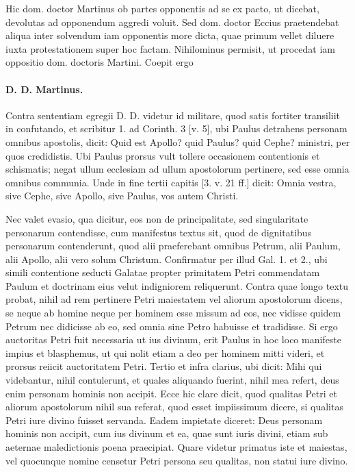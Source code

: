 Hic dom. doctor Martinus ob partes opponentis ad se ex pacto, ut dicebat, devolutas ad opponendum aggredi voluit. Sed dom. doctor Eccius praetendebat aliqua inter solvendum iam opponentis more dicta, quae primum vellet diluere iuxta protestationem super hoc factam. Nihilominus permisit, ut procedat iam oppositio dom. doctoris Martini. Coepit ergo

\paragraph*{D. D. Martinus.}

Contra sententiam egregii D. D. videtur id militare, quod satis fortiter transiliit in confutando, et scribitur 1. ad Corinth. 3 [v. 5], ubi Paulus detrahens \marginpar{\small[304]} personam omnibus apostolis, dicit: Quid est Apollo? quid Paulus? quid Cephe? ministri, per quos credidistis. Ubi Paulus prorsus vult tollere occasionem contentionis et schismatis; negat ullum ecclesiam ad ullum apostolorum pertinere, sed esse omnia omnibus communia. Unde in fine tertii capitis [3. v. 21 ff.] dicit: Omnia vestra, sive Cephe, sive Apollo, sive Paulus, vos autem Christi.

Nec valet evasio, qua dicitur, eos non de principalitate, sed singularitate personarum contendisse, cum manifestus textus sit, quod de dignitatibus personarum contenderunt, quod alii praeferebant omnibus Petrum, alii Paulum, alii Apollo, alii vero solum Christum. Confirmatur per illud Gal. 1. et 2., ubi simili contentione seducti Galatae propter primitatem Petri commendatam Paulum et doctrinam eius velut indigniorem reliquerunt. Contra quae longo textu probat, nihil ad rem pertinere Petri maiestatem vel aliorum apostolorum dicens, se neque ab homine neque per hominem esse missum ad eos, nec vidisse quidem Petrum nec didicisse ab eo, sed omnia sine Petro habuisse et tradidisse. Si ergo auctoritas Petri fuit necessaria ut ius divinum, erit Paulus in hoc loco manifeste impius et blasphemus, ut qui nolit etiam a deo per hominem mitti videri, et prorsus reiicit auctoritatem Petri. Tertio et infra clarius, ubi dicit: Mihi qui videbantur, nihil contulerunt, et quales aliquando fuerint, nihil mea refert, deus enim personam hominis non accipit. Ecce hic clare dicit, quod qualitas Petri et aliorum apostolorum nihil sua referat, quod esset impiissimum dicere, si qualitas Petri iure divino fuisset servanda. Eadem impietate diceret: Deus personam hominis non accipit, cum ius divinum et ea, quae sunt iuris divini, etiam sub aeternae maledictionis poena praecipiat. Quare videtur primatus iste et maiestas, vel quocunque nomine censetur Petri persona seu qualitas, non statui iure divino.

